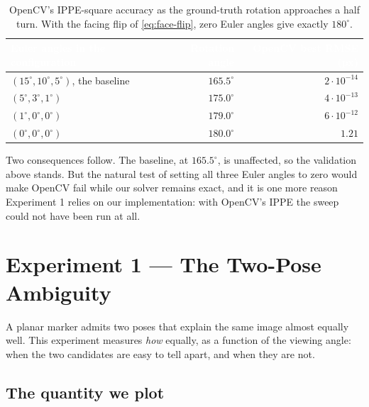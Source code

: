 \documentclass[11pt,a4paper]{article}
\theoremstyle{definition}
\theoremstyle{plain}
\theoremstyle{remark}
\newcommand{\thcell}[1]{\textcolor{white}{\textbf{#1}}}
\begin{document}
\begin{table}[h!]
\centering\small
\begin{tabularx}{\linewidth}{@{}Yrr@{}}
\toprule
{}\thcell{Euler angles in the configuration}&\thcell{Rotation angle}&\thcell{OpenCV best RMSE (px)}\\
\midrule
$(15^\circ,10^\circ,5^\circ)$, the baseline & $165.5^\circ$ & $2\cdot10^{-14}$\\
 $(5^\circ,3^\circ,1^\circ)$ & $175.0^\circ$ & $4\cdot10^{-13}$\\
$(1^\circ,0^\circ,0^\circ)$ & $179.0^\circ$ & $6\cdot10^{-12}$\\
 $(0^\circ,0^\circ,0^\circ)$ & $180.0^\circ$ & $1.21$\\
\bottomrule
\end{tabularx}
\caption{OpenCV's IPPE-square accuracy as the ground-truth rotation approaches
a half turn. With the facing flip of \eqref{eq:face-flip}, zero Euler angles
give exactly $180^\circ$.}
\label{tab:opencv180}
\end{table}

Two consequences follow. The baseline, at $165.5^\circ$, is unaffected, so the
validation above stands. But the natural test of setting all three Euler angles
to zero would make OpenCV fail while our solver remains exact, and it is one
more reason Experiment 1 relies on our implementation: with OpenCV's IPPE the
sweep could not have been run at all.

\section{Experiment 1 --- The Two-Pose Ambiguity}
\label{sec:experiment1}

A planar marker admits two poses that explain the same image almost equally
well. This experiment measures \emph{how} equally, as a function of the viewing
angle: when the two candidates are easy to tell apart, and when they are not.

\subsection{The quantity we plot}
\label{sec:rmse}
\end{document}
